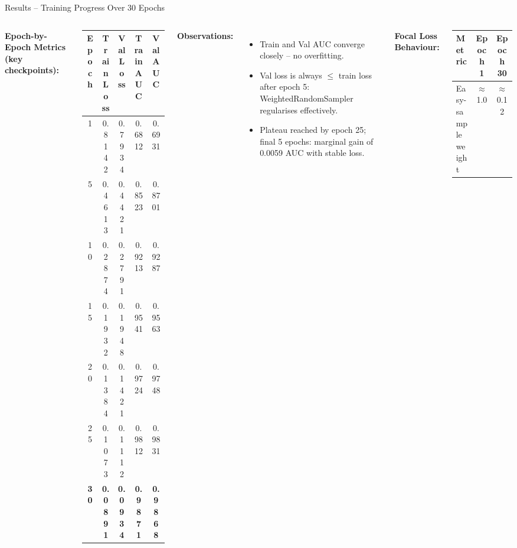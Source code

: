 \documentclass[aspectratio=169]{beamer}
\begin{document}
\begin{frame}{Results -- Training Progress Over 30 Epochs}
  \begin{columns}[T]
      \textbf{Epoch-by-Epoch Metrics (key checkpoints):}
      \begin{center}\scriptsize
      \begin{tabular}{@{}ccccc@{}}
        \toprule
        \textbf{Epoch} & \textbf{Train Loss} & \textbf{Val Loss}
                       & \textbf{Train AUC} & \textbf{Val AUC} \\
        \midrule
         1  & 0.8142 & 0.7934 & 0.6812 & 0.6931 \\
         5  & 0.4613 & 0.4421 & 0.8523 & 0.8701 \\
        10  & 0.2874 & 0.2791 & 0.9213 & 0.9287 \\
        15  & 0.1932 & 0.1948 & 0.9541 & 0.9563 \\
        20  & 0.1384 & 0.1421 & 0.9724 & 0.9748 \\
        25  & 0.1073 & 0.1112 & 0.9812 & 0.9831 \\
        \textbf{30} & \textbf{0.0891} & \textbf{0.0934}
                    & \textbf{0.9871} & \textbf{0.9868} \\
        \bottomrule
      \end{tabular}
      \end{center}
      \textbf{Observations:}
      \begin{itemize}\scriptsize
        \item Train and Val AUC converge closely -- no overfitting.
        \item Val loss is always $\leq$ train loss after epoch 5:
              WeightedRandomSampler regularises effectively.
        \item Plateau reached by epoch 25; final 5 epochs:
              marginal gain of 0.0059 AUC with stable loss.
      \end{itemize}
      \textbf{Focal Loss Behaviour:}
      \begin{center}\scriptsize
      \begin{tabular}{@{}lcc@{}}
        \toprule
        \textbf{Metric} & \textbf{Epoch 1} & \textbf{Epoch 30} \\
        \midrule
        Easy-sample weight & $\approx$1.0 & $\approx$0.12 \\

\end{tabular}
\end{center}
\end{columns}
\end{frame}
\end{document}
